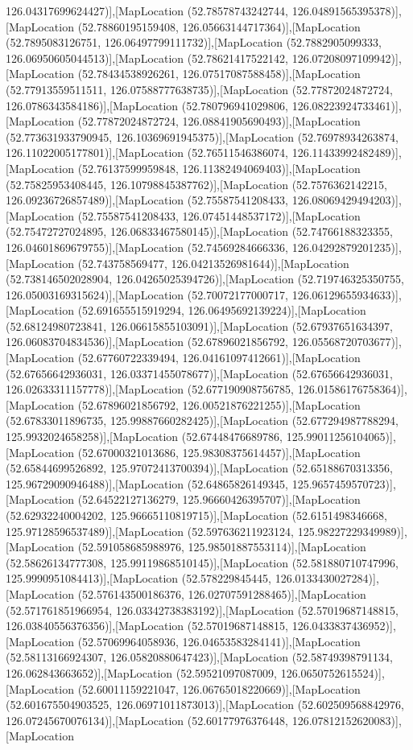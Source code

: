 126.04317699624427)],[MapLocation (52.78578743242744, 126.04891565395378)],[MapLocation (52.78860195159408, 126.05663144717364)],[MapLocation (52.7895083126751, 126.06497799111732)],[MapLocation (52.7882905099333, 126.06950605044513)],[MapLocation (52.78621417522142, 126.07208097109942)],[MapLocation (52.78434538926261, 126.07517087588458)],[MapLocation (52.77913559511511, 126.07588777638735)],[MapLocation (52.77872024872724, 126.0786343584186)],[MapLocation (52.780796941029806, 126.08223924733461)],[MapLocation (52.77872024872724, 126.08841905690493)],[MapLocation (52.773631933790945, 126.10369691945375)],[MapLocation (52.76978934263874, 126.11022005177801)],[MapLocation (52.76511546386074, 126.11433992482489)],[MapLocation (52.76137599959848, 126.11382494069403)],[MapLocation (52.75825953408445, 126.10798845387762)],[MapLocation (52.7576362142215, 126.09236726857489)],[MapLocation (52.75587541208433, 126.08069429494203)],[MapLocation (52.75587541208433, 126.07451448537172)],[MapLocation (52.75472727024895, 126.06833467580145)],[MapLocation (52.74766188323355, 126.04601869679755)],[MapLocation (52.74569284666336, 126.04292879201235)],[MapLocation (52.743758569477, 126.04213526981644)],[MapLocation (52.738146502028904, 126.04265025394726)],[MapLocation (52.719746325350755, 126.05003169315624)],[MapLocation (52.70072177000717, 126.06129655934633)],[MapLocation (52.691655515919294, 126.06495692139224)],[MapLocation (52.68124980723841, 126.06615855103091)],[MapLocation (52.67937651634397, 126.06083704834536)],[MapLocation (52.67896021856792, 126.05568720703677)],[MapLocation (52.67760722339494, 126.04161097412661)],[MapLocation (52.67656642936031, 126.03371455078677)],[MapLocation (52.67656642936031, 126.02633311157778)],[MapLocation (52.677190908756785, 126.01586176758364)],[MapLocation (52.67896021856792, 126.00521876221255)],[MapLocation (52.67833011896735, 125.99887660282425)],[MapLocation (52.677294987788294, 125.9932024658258)],[MapLocation (52.67448476689786, 125.99011256104065)],[MapLocation (52.67000321013686, 125.98308375614457)],[MapLocation (52.65844699526892, 125.97072413700394)],[MapLocation (52.65188670313356, 125.96729090946488)],[MapLocation (52.64865826149345, 125.9657459570723)],[MapLocation (52.64522127136279, 125.96660426395707)],[MapLocation (52.62932240004202, 125.96665110819715)],[MapLocation (52.6151498346668, 125.97128596537489)],[MapLocation (52.597636211923124, 125.98227229349989)],[MapLocation (52.591058685988976, 125.98501887553114)],[MapLocation (52.58626134777308, 125.99119868510145)],[MapLocation (52.581880710747996, 125.9990951084413)],[MapLocation (52.578229845445, 126.0133430027284)],[MapLocation (52.576143500186376, 126.02707591288465)],[MapLocation (52.571761851966954, 126.03342738383192)],[MapLocation (52.57019687148815, 126.03840556376356)],[MapLocation (52.57019687148815, 126.0433837436952)],[MapLocation (52.57069964058936, 126.04653583284141)],[MapLocation (52.58113166924307, 126.05820880647423)],[MapLocation (52.58749398791134, 126.062843663652)],[MapLocation (52.59521097087009, 126.0650752615524)],[MapLocation (52.60011159221047, 126.06765018220669)],[MapLocation (52.601675504903525, 126.06971011873013)],[MapLocation (52.602509568842976, 126.07245670076134)],[MapLocation (52.60177976376448, 126.07812152620083)],[MapLocation 